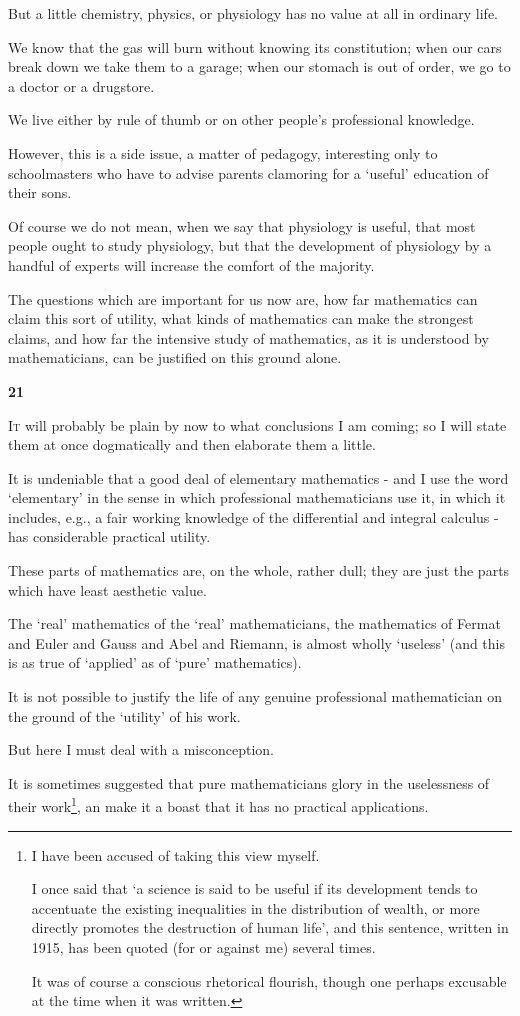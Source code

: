 \documentclass{article}
\numberwithin{equation}{section}
\begin{document}
But a little chemistry, physics, or physiology has no value at all in ordinary life.

We know that the gas will burn without knowing its constitution; when our cars break down we take them to a garage; when our stomach is out of order, we go to a doctor or a drugstore.

We live either by rule of thumb or on other people's professional knowledge.

%
However, this is a side issue, a matter of pedagogy, interesting only to schoolmasters who have to advise parents clamoring for a `useful' education of their sons.

Of course we do not mean, when we say that physiology is useful, that most people ought to study physiology, but that the development of physiology by a handful of experts will increase the comfort of the majority.

The questions which are important for us now are, how far mathematics can claim this sort of utility, what kinds of mathematics can make the strongest claims, and how far the intensive study of mathematics, as it is understood by mathematicians, can be justified on this ground alone.

\begin{center}
    \large\textbf{21}
\end{center}
\textsc{It} will probably be plain by now to what conclusions I am coming; so I will state them at once dogmatically and then elaborate them a little.

It is undeniable that a good deal of elementary mathematics - and I use the word `elementary' in the sense in which professional mathematicians use it, in which it includes, e.g., a fair working knowledge of the differential and integral calculus - has considerable practical utility.

These parts of mathematics are, on the whole, rather dull; they are just the parts which have least aesthetic value.

The `real' mathematics of the `real' mathematicians, the mathematics of Fermat and Euler and Gauss and Abel and Riemann, is almost wholly `useless' (and this is as true of `applied' as of `pure' mathematics).

It is not possible to justify the life of any genuine professional mathematician on the ground of the `utility' of his work.

%
But here I must deal with a misconception.

It is sometimes suggested that pure mathematicians glory in the uselessness of their work\footnote{I have been accused of taking this view myself.

I once said that `a science is said to be useful if its development tends to accentuate the existing inequalities in the distribution of wealth, or more directly promotes the destruction of human life', and this sentence, written in 1915, has been quoted (for or against me) several times.

It was of course a conscious rhetorical flourish, though one perhaps excusable at the time when it was written.}, an make it a boast that it has no practical applications.
\end{document}
